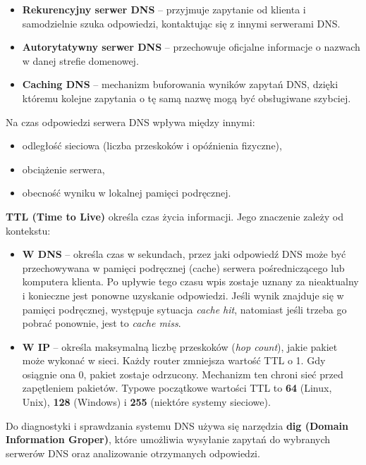 \documentclass[11pt,a4paper]{article}
\begin{document}
\begin{itemize}
    \item \textbf{Rekurencyjny serwer DNS} -- przyjmuje zapytanie od klienta i samodzielnie szuka odpowiedzi, kontaktując się z innymi serwerami DNS.
    \item \textbf{Autorytatywny serwer DNS} -- przechowuje oficjalne informacje o nazwach w danej strefie domenowej.
    \item \textbf{Caching DNS} -- mechanizm buforowania wyników zapytań DNS, dzięki któremu kolejne zapytania o tę samą nazwę mogą być obsługiwane szybciej.
\end{itemize}

Na czas odpowiedzi serwera DNS wpływa między innymi:
\begin{itemize}
    \item odległość sieciowa (liczba przeskoków i opóźnienia fizyczne),
    \item obciążenie serwera,
    \item obecność wyniku w lokalnej pamięci podręcznej.
\end{itemize}

\textbf{TTL (Time to Live)} określa czas życia informacji. Jego znaczenie zależy od kontekstu:

\begin{itemize}
    \item \textbf{W DNS} -- określa czas w sekundach, przez jaki odpowiedź DNS może być przechowywana w pamięci podręcznej (cache) serwera pośredniczącego lub komputera klienta. Po upływie tego czasu wpis zostaje uznany za nieaktualny i konieczne jest ponowne uzyskanie odpowiedzi. Jeśli wynik znajduje się w pamięci podręcznej, występuje sytuacja \textit{cache hit}, natomiast jeśli trzeba go pobrać ponownie, jest to \textit{cache miss}.
    
    \item \textbf{W IP} -- określa maksymalną liczbę przeskoków (\textit{hop count}), jakie pakiet może wykonać w sieci. Każdy router zmniejsza wartość TTL o 1. Gdy osiągnie ona 0, pakiet zostaje odrzucony. Mechanizm ten chroni sieć przed zapętleniem pakietów. Typowe początkowe wartości TTL to \textbf{64} (Linux, Unix), \textbf{128} (Windows) i \textbf{255} (niektóre systemy sieciowe).
\end{itemize}

Do diagnostyki i sprawdzania systemu DNS używa się narzędzia \textbf{dig (Domain Information Groper)}, które umożliwia wysyłanie zapytań do wybranych serwerów DNS oraz analizowanie otrzymanych odpowiedzi.
\end{document}
